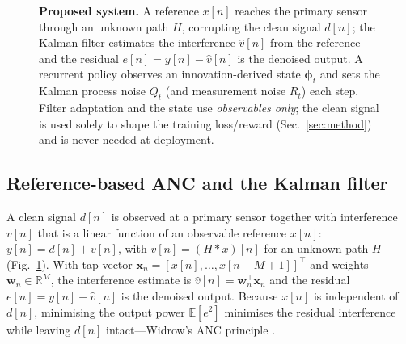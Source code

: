 \documentclass[journal]{IEEEtran}
\begin{document}
\begin{figure}[!t]
{%
}
\caption{\textbf{Proposed system.} A reference $x[n]$ reaches the primary
sensor through an unknown path $H$, corrupting the clean signal $d[n]$; the
Kalman filter estimates the interference $\hat{v}[n]$ from the reference and
the residual $e[n]=y[n]-\hat{v}[n]$ is the denoised output. A recurrent policy
observes an innovation-derived state $\bm{\phi}_t$ and sets the Kalman process
noise $Q_t$ (and measurement noise $R_t$) each step. Filter adaptation and the
state use \emph{observables only}; the clean signal is used solely to shape the
training loss/reward (Sec.~\ref{sec:method}) and is never needed at
deployment.}
\label{fig:arch}
\end{figure}

\subsection{Reference-based ANC and the Kalman filter}
A clean signal $d[n]$ is observed at a primary sensor together with
interference $v[n]$ that is a linear function of an observable reference
$x[n]$: $y[n]=d[n]+v[n]$, with $v[n]=(H\!*\!x)[n]$ for an unknown path $H$
(Fig.~\ref{fig:arch}). With tap vector
$\mathbf{x}_n=[x[n],\dots,x[n{-}M{+}1]]^{\top}$ and weights
$\mathbf{w}_n\in\mathbb{R}^{M}$, the interference estimate is
$\hat{v}[n]=\mathbf{w}_n^{\top}\mathbf{x}_n$ and the residual
$e[n]=y[n]-\hat{v}[n]$ is the denoised output. Because $x[n]$ is independent of
$d[n]$, minimising the output power $\mathbb{E}[e^2]$ minimises the residual
interference while leaving $d[n]$ intact---Widrow's ANC principle
\cite{widrow1975anc}.
\end{document}
